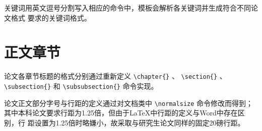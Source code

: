 关键词用英文逗号分割写入相应的命令中，模板会解析各关键词并生成符合不同论文格式
要求的关键词格式。
\begin{code}
\end{code}

\section{正文章节}
\label{sec:mainbody}

论文各章节标题的格式分别通过重新定义 \verb|\chapter{}| 、 \verb|\section{}| 、
\verb|\subsection{}| 和 \verb|\subsubsection{}| 命令实现。

论文正文部分字号与行距的定义通过对文档类中 \verb|\normalsize| 命令修改而得到；
其中本科论文要求行距为1.25倍，但由于\LaTeX{}中行距的定义与Word中存在区别，行
距设置为1.25倍时略嫌小，故采取与研究生论文同样的固定20磅行距。

% 

